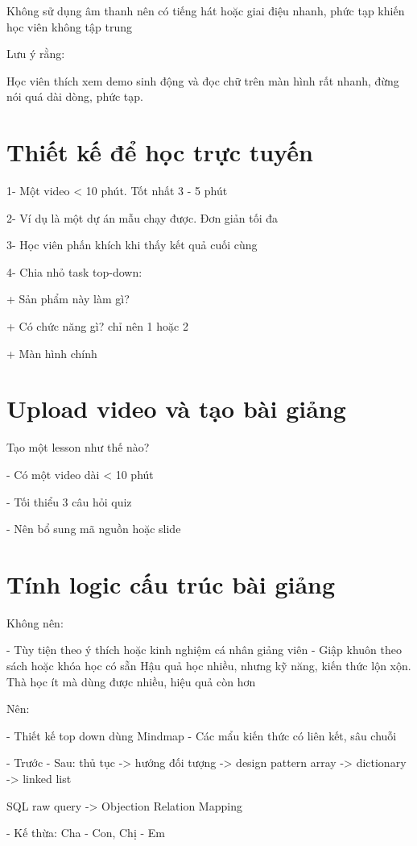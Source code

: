Không sử dụng âm thanh nên có tiếng hát hoặc giai điệu nhanh, phức tạp khiến học viên không tập trung

Lưu ý rằng:

Học viên thích xem demo sinh động và đọc chữ trên màn hình rất nhanh, đừng nói quá dài dòng, phức tạp.

\section{Thiết kế để học trực tuyến}

1- Một video < 10 phút. Tốt nhất 3 - 5 phút

2- Ví dụ là một dự án mẫu chạy được. Đơn giản tối đa

3- Học viên phấn khích khi thấy kết quả cuối cùng

4- Chia nhỏ task top-down:

+ Sản phẩm này làm gì?

+ Có chức năng gì? chỉ nên 1 hoặc 2

+ Màn hình chính

\section{Upload video và tạo bài giảng}

Tạo một lesson như thế nào?

- Có một video dài < 10 phút

- Tối thiểu 3 câu hỏi quiz

- Nên bổ sung mã nguồn hoặc slide

\section{Tính logic cấu trúc bài giảng}

Không nên:

- Tùy tiện theo ý thích hoặc kinh nghiệm cá nhân giảng viên
- Giập khuôn theo sách hoặc khóa học có sẵn
Hậu quả học nhiều, nhưng kỹ năng, kiến thức lộn xộn. Thà học ít mà dùng được nhiều, hiệu quả còn hơn

Nên:

- Thiết kế top down dùng Mindmap
- Các mẩu kiến thức có liên kết, sâu chuỗi

- Trước - Sau:
 thủ tục -> hướng đối tượng -> design pattern
 array -> dictionary -> linked list

 SQL raw query -> Objection Relation Mapping

- Kế thừa: Cha - Con, Chị - Em

